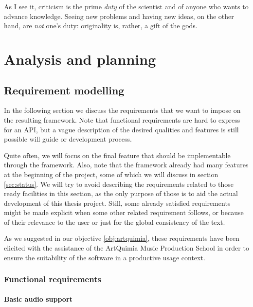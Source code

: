 
\begin{savequote}[10pc]
  \sffamily As I see it, criticism is the prime \emph{duty} of the
  scientist and of anyone who wants to advance knowledge. Seeing new
  problems and having new ideas, on the other hand, are \emph{not}
  one's duty: originality is, rather, a gift of the gods.
\end{savequote}

\chapter{Analysis and planning}

\section{Requirement modelling}

In the following section we discuss the requirements that we want to
impose on the resulting framework. Note that functional requirements
are hard to express for an API, but a vague description of the desired
qualities and features is still possible will guide or development
process.

Quite often, we will focus on the final feature that should be
implementable through the framework. Also, note that the framework
already had many features at the beginning of the project, some of
which we will discuss in section \ref{sec:status}. We will try to
avoid describing the requirements related to those ready facilities in
this section, as the only purpose of those is to aid the actual
development of this thesis project. Still, some already satisfied
requirements might be made explicit when some other related
requirement follows, or because of their relevance to the user or just
for the global consistency of the text.

As we suggested in our objective \ref{obj:artquimia}, these
requirements have been elicited with the assistance of the ArtQuimia
Music Production School in order to ensure the suitability of the
software in a productive usage context.

\subsection{Functional requirements}

\subsubsection{Basic audio support}

